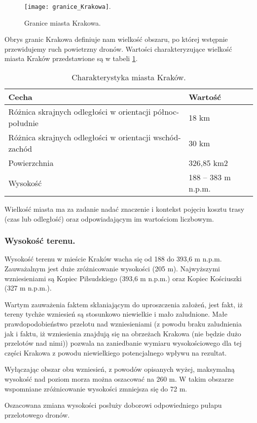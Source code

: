 \documentclass[twoside, 12pt]{article}
\begin{document}
\begin{figure}[h]
	\centering
	\texttt{[image: granice\_Krakowa]}.
	\caption{Granice miasta Krakowa.\label{fig:granice}}
\end{figure}

\par Obrys granic Krakowa definiuje nam wielkość obszaru, po której wstępnie przewidujemy ruch powietrzny dronów. Wartości charakteryzujące wielkość miasta Kraków przedstawione są w tabeli \ref{tab:odleglosci}.

\begin{table}[h]
	\centering
	\begin{tabular}{|l|l|}
		\hline Cecha & Wartość\\
		\hline Różnica skrajnych odległości w orientacji północ-południe & 18 km\\
		\hline Różnica skrajnych odległości w orientacji wschód-zachód & 30 km\\
		\hline Powierzchnia & 326,85 km2\\
		\hline Wysokość & 188 – 383 m n.p.m.\\
		\hline
	\end{tabular}
	\caption{Charakterystyka miasta Kraków.\label{tab:odleglosci}}
\end{table}

\par Wielkość miasta ma za zadanie nadać znaczenie i kontekst pojęciu kosztu trasy (czas lub odległość) oraz odpowiadającym im wartościom liczbowym.



\subsubsection{Wysokość terenu.}
\par Wysokość terenu w mieście Kraków wacha się od 188 do 393,6 m n.p.m. Zauważalnym jest duże zróżnicowanie wysokości (205 m). Najwyższymi wzniesieniami są Kopiec Piłsudskiego (393,6 m n.p.m.) oraz Kopiec Kościuszki (327 m n.p.m.).
\par Wartym zauważenia faktem skłaniającym do uproszczenia założeń, jest fakt, iż tereny tychże wzniesień są stosunkowo niewielkie i mało zaludnione. Małe prawdopodobieństwo przelotu nad wzniesieniami (z powodu braku zaludnienia jak i faktu, iż wzniesienia znajdują się na obrzeżach Krakowa (nie będzie dużo przelotów nad nimi)) pozwala na zaniedbanie wymiaru wysokościowego dla tej części Krakowa z powodu niewielkiego potencjalnego wpływu na rezultat.
\par Wyłączając obszar obu wzniesień, z powodów opisanych wyżej, maksymalną wysokość nad poziom morza można oszacować na 260 m. W takim obszarze wspomniane zróżnicowanie wysokości zmniejsza się do 72 m.
\par Oszacowana zmiana wysokości posłuży doborowi odpowiedniego pułapu przelotowego dronów.
\end{document}
